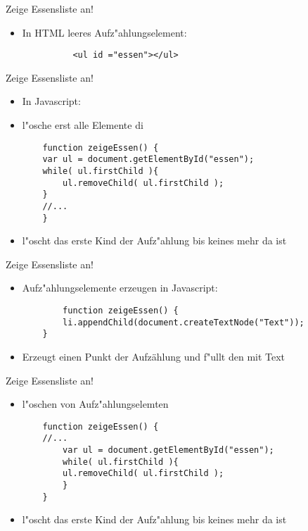 \documentclass[18pt]{beamer}
\begin{document}
\begin{frame}[fragile]{Zeige Essensliste an!}
\begin{itemize}
	\item In HTML leeres Aufz"ahlungselement:
	\begin{lstlisting}
		  <ul id ="essen"></ul>
	\end{lstlisting}
\end{itemize}
\end{frame}
\begin{frame}[fragile]{Zeige Essensliste an!}
\begin{itemize}
	\item In Javascript: 
	\item l"osche erst alle Elemente di
	\begin{lstlisting}
	function zeigeEssen() {
	var ul = document.getElementById("essen");
	while( ul.firstChild ){
		ul.removeChild( ul.firstChild );
	}
	//...
	}
	\end{lstlisting}
	\item l"oscht das erste Kind der Aufz"ahlung bis keines mehr da ist
\end{itemize}
\end{frame}

\begin{frame}[fragile]{Zeige Essensliste an!}
\begin{itemize}
	\item Aufz"ahlungselemente erzeugen in Javascript: 
	\begin{lstlisting}
		function zeigeEssen() {
		li.appendChild(document.createTextNode("Text"));
	}
	\end{lstlisting}
	\item Erzeugt einen Punkt der Aufzählung und f"ullt den mit Text
\end{itemize}
\end{frame}


\begin{frame}[fragile]{Zeige Essensliste an!}
\begin{itemize}
	\item l"oschen von Aufz"ahlungselemten
	\begin{lstlisting}
	function zeigeEssen() {
	//...
		var ul = document.getElementById("essen");
		while( ul.firstChild ){
		ul.removeChild( ul.firstChild );
		}
	}
	\end{lstlisting}
	\item l"oscht das erste Kind der Aufz"ahlung bis keines mehr da ist
\end{itemize}

\end{frame}
\end{document}
